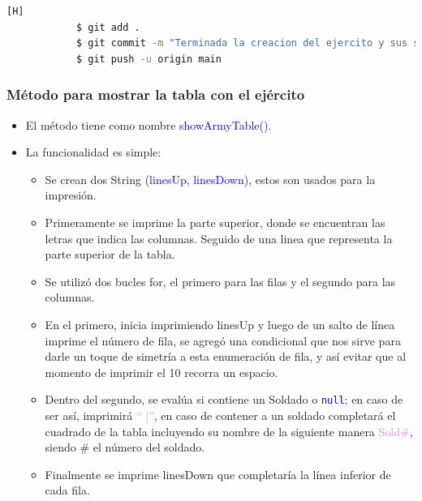 \documentclass{article}
\begin{document}
        \begin{lstlisting}[language=bash,caption={Commit: En el mismo commit donde se termino el toString y el método constructor, se concluyó con el método createArmy(), para verificar su funcionalidad se utilizó la impresión en consola}][H]
    		$ git add .
    		$ git commit -m "Terminada la creacion del ejercito y sus soldados, se imprimieron sus datos para realizar las pruebas"			
    		$ git push -u origin main
    	\end{lstlisting}
        
        
        \subsubsection{Método para mostrar la tabla con el ejército}

        \begin{itemize}
            \item El método tiene como nombre \textcolor{blue}{showArmyTable()}.
            \item La funcionalidad es simple:
            \begin{itemize}
                \item Se crean dos String (\textcolor{blue}{linesUp, linesDown}), estos son usados para la impresión.
                \item Primeramente se imprime la parte superior, donde se encuentran las letras que indica las columnas. Seguido de una linea que representa la parte superior de la tabla.
                \item Se utilizó dos bucles for, el primero para las filas y el segundo para las columnas.
                \item En el primero, inicia imprimiendo linesUp y luego de un salto de línea imprime el número de fila, se agregó una condicional que nos sirve para darle un toque de simetría a esta enumeración de fila, y así evitar que al momento de imprimir el 10 recorra un espacio.
                \item Dentro del segundo, se evalúa si contiene un Soldado o \textcolor{blue}{\texttt{null}}; en caso de ser así, imprimirá \textcolor{violet}{`` |''}, en caso de contener a un soldado completará el cuadrado de la tabla incluyendo su nombre de la siguiente manera \textcolor{violet}{Sold\#}, siendo \# el número del soldado.
                \item Finalmente se imprime linesDown que completaría la línea inferior de cada fila.
            \end{itemize}
        \end{itemize}
\end{document}
